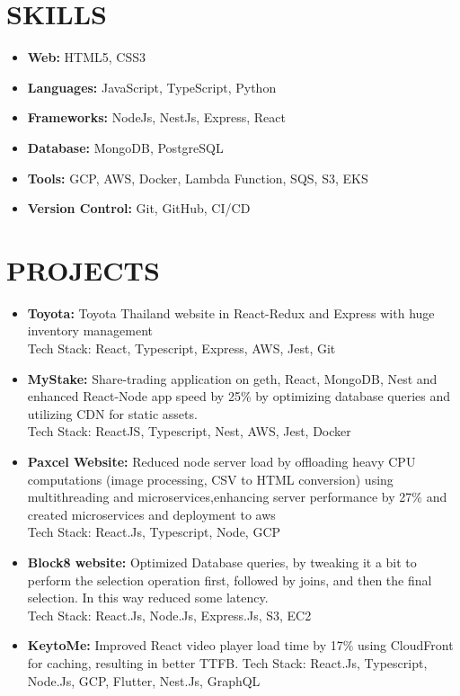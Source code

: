 \documentclass[line, margin, 12pt]{res}
\begin{document}
\begin{resume}
\section{SKILLS}
\begin{itemize}
\item \textbf{Web:} HTML5, CSS3
\item \textbf{Languages:} JavaScript, TypeScript, Python
\item \textbf{Frameworks:} NodeJs, NestJs, Express, React
\item \textbf{Database:} MongoDB, PostgreSQL
\item \textbf{Tools:} GCP, AWS, Docker, Lambda Function, SQS, S3, EKS
\item \textbf{Version Control:} Git, GitHub, CI/CD
\end{itemize}

\section{PROJECTS}
\begin{itemize}
\item \textbf{Toyota:} Toyota Thailand website in React-Redux and Express with huge inventory management \\
Tech Stack: React, Typescript, Express, AWS, Jest, Git \\

\item \textbf{MyStake:} Share-trading application on geth, React, MongoDB, Nest and
enhanced React-Node app speed by 25\% by optimizing database queries and utilizing CDN for static assets. \\
Tech Stack: ReactJS, Typescript, Nest, AWS, Jest, Docker \\

\item \textbf{Paxcel Website:} Reduced node server load by offloading heavy CPU computations (image processing, CSV to HTML conversion) using multithreading and microservices,enhancing server performance by 27\% and created microservices and deployment to aws \\
Tech Stack: React.Js, Typescript, Node, GCP \\

\item \textbf{Block8 website:} Optimized Database queries, by tweaking it a bit to perform the selection operation first, followed by joins, and then the final selection. In this way reduced some latency.\\
Tech Stack: React.Js, Node.Js, Express.Js, S3, EC2 \\

\item \textbf{KeytoMe:} Improved React video player load time by 17\% using CloudFront for caching, resulting in better TTFB.
Tech Stack: React.Js, Typescript, Node.Js, GCP, Flutter, Nest.Js, GraphQL \\
\end{itemize}


\end{resume}
\end{document}
